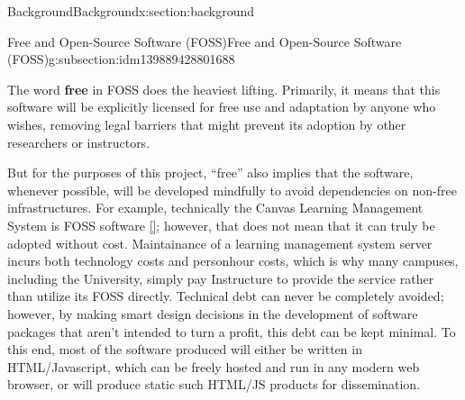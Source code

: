 \documentclass[oneside,10pt,]{article}
\newcommand{\xreffont}{\relax}
\newcommand{\terminology}[1]{\textbf{#1}}
\begin{document}
\begin{sectionptx}{Background}{}{Background}{}{}{x:section:background}
\begin{subsectionptx}{Free and Open-Source Software (FOSS)}{}{Free and Open-Source Software (FOSS)}{}{}{g:subsection:idm139889428801688}
\par
The word \terminology{free} in FOSS does the heaviest lifting. Primarily, it means that this software will be explicitly licensed for free use and adaptation by anyone who wishes, removing legal barriers that might prevent its adoption by other researchers or instructors.%
\par
But for the purposes of this project, ``free'' also implies that the software, whenever possible, will be developed mindfully to avoid dependencies on non-free infrastructures. For example, technically the Canvas Learning Management System is FOSS software \hyperlink{x:biblio:biblio-canvas}{[{\xreffont 16}]}; however, that does not mean that it can truly be adopted without cost. Maintainance of a learning management system server incurs both technology costs and personhour costs, which is why many campuses, including the University, simply pay Instructure to provide the service rather than utilize its FOSS directly. Technical debt can never be completely avoided; however, by making smart design decisions in the development of software packages that aren't intended to turn a profit, this debt can be kept minimal. To this end, most of the software produced will either be written in HTML\slash{}Javascript, which can be freely hosted and run in any modern web browser, or will produce static such HTML\slash{}JS products for dissemination.%
\end{subsectionptx}
\end{sectionptx}
%
%
\typeout{************************************************}
\typeout{************************************************}
%
\end{document}
